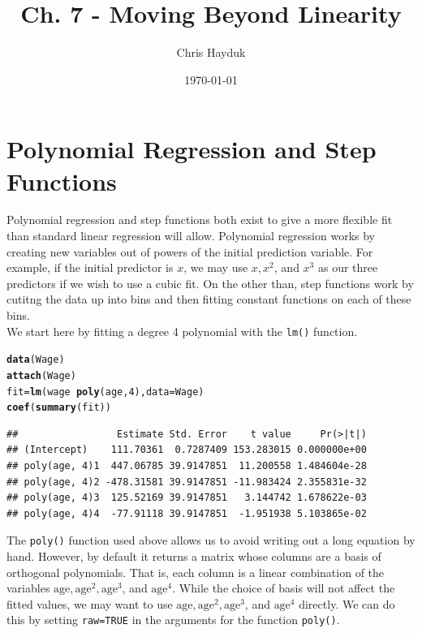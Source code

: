 \documentclass[12pt]{article}\usepackage[]{graphicx}\usepackage[]{color}
\makeatletter
\newcommand{\hlnum}[1]{\textcolor[rgb]{0.686,0.059,0.569}{#1}}%
\newcommand{\hlopt}[1]{\textcolor[rgb]{0,0,0}{#1}}%
\newcommand{\hlstd}[1]{\textcolor[rgb]{0.345,0.345,0.345}{#1}}%
\newcommand{\hlkwb}[1]{\textcolor[rgb]{0.69,0.353,0.396}{#1}}%
\newcommand{\hlkwc}[1]{\textcolor[rgb]{0.333,0.667,0.333}{#1}}%
\newcommand{\hlkwd}[1]{\textcolor[rgb]{0.737,0.353,0.396}{\textbf{#1}}}%
\newenvironment{kframe}{%
 \def\at@end@of@kframe{}%
 \ifinner\ifhmode%
  \def\at@end@of@kframe{\end{minipage}}%
  \begin{minipage}{\columnwidth}%
 \fi\fi%
 \def\FrameCommand##1{\hskip\@totalleftmargin \hskip-\fboxsep
 \colorbox{shadecolor}{##1}\hskip-\fboxsep
     \hskip-\linewidth \hskip-\@totalleftmargin \hskip\columnwidth}%
 \MakeFramed {\advance\hsize-\width
   \@totalleftmargin\z@ \linewidth\hsize
   \@setminipage}}%
 {\par\unskip\endMakeFramed%
 \at@end@of@kframe}
\newenvironment{knitrout}{}{} %
\makeatother
\begin{document}
\title{Ch. 7 - Moving Beyond Linearity}

\author{Chris Hayduk}
\date{\today}

\maketitle



\section{Polynomial Regression and Step Functions}

Polynomial regression and step functions both exist to give a more flexible fit than standard linear regression will allow. Polynomial regression works by creating new variables out of powers of the initial prediction variable. For example, if the initial predictor is $x$, we may use $x, x^2$, and $x^3$ as our three predictors if we wish to use a cubic fit. On the other than, step functions work by cutitng the data up into bins and then fitting constant functions on each of these bins.\\

We start here by fitting a degree 4 polynomial with the \texttt{lm()} function.

\begin{knitrout}
\color{fgcolor}\begin{kframe}
\begin{alltt}
\hlkwd{data}\hlstd{(Wage)}
\hlkwd{attach}\hlstd{(Wage)}
\hlstd{fit}\hlkwb{=}\hlkwd{lm}\hlstd{(wage}\hlopt{~}\hlkwd{poly}\hlstd{(age,}\hlnum{4}\hlstd{),} \hlkwc{data}\hlstd{=Wage)}
\hlkwd{coef}\hlstd{(}\hlkwd{summary}\hlstd{(fit))}
\end{alltt}
\begin{verbatim}
##                 Estimate Std. Error    t value     Pr(>|t|)
## (Intercept)    111.70361  0.7287409 153.283015 0.000000e+00
## poly(age, 4)1  447.06785 39.9147851  11.200558 1.484604e-28
## poly(age, 4)2 -478.31581 39.9147851 -11.983424 2.355831e-32
## poly(age, 4)3  125.52169 39.9147851   3.144742 1.678622e-03
## poly(age, 4)4  -77.91118 39.9147851  -1.951938 5.103865e-02
\end{verbatim}
\end{kframe}
\end{knitrout}

The \texttt{poly()} function used above allows us to avoid writing out a long equation by hand. However, by default it returns a matrix whose columns are a basis of orthogonal polynomials. That is, each column is a linear combination of the variables $\text{age}, \text{age}^2, \text{age}^3$, and $\text{age}^4$. While the choice of basis will not affect the fitted values, we may want to use $\text{age}, \text{age}^2, \text{age}^3$, and $\text{age}^4$ directly. We can do this by setting \texttt{raw=TRUE} in the arguments for the function \texttt{poly()}.
\end{document}
